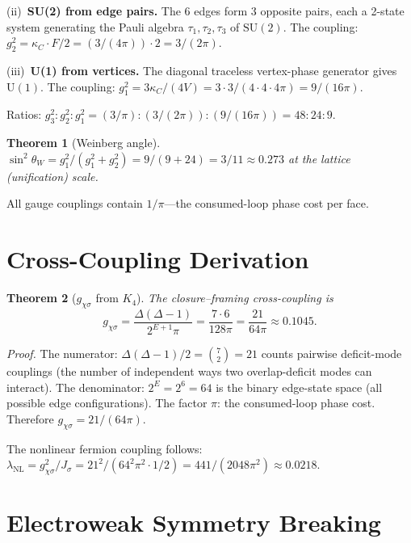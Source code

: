 \documentclass[11pt,twocolumn]{article}
\newtheorem{theorem}{Theorem}
\begin{document}
(ii)~\textbf{SU(2) from edge pairs.} The 6 edges form 3 opposite pairs, each a 2-state system generating the Pauli algebra $\tau_1,\tau_2,\tau_3$ of $\mathrm{SU}(2)$.
The coupling: $g_2^2=\kappa_C\cdot F/2=(3/(4\pi))\cdot 2=3/(2\pi)$.

(iii)~\textbf{U(1) from vertices.} The diagonal traceless vertex-phase generator gives $\mathrm{U}(1)$.
The coupling: $g_1^2=3\kappa_C/(4V)=3\cdot 3/(4\cdot 4\cdot 4\pi)=9/(16\pi)$.

Ratios: $g_3^2:g_2^2:g_1^2=(3/\pi):(3/(2\pi)):(9/(16\pi))=48:24:9$.

\begin{theorem}[Weinberg angle]
\label{thm:weinberg}
$\sin^2\theta_W=g_1^2/(g_1^2+g_2^2)=9/(9+24)=3/11\approx 0.273$ at the lattice (unification) scale.
\end{theorem}

All gauge couplings contain $1/\pi$---the consumed-loop phase cost per face.

\section{Cross-Coupling Derivation}
\label{sec:crosscoupling}

\begin{theorem}[$g_{\chi\sigma}$ from $K_4$]
\label{thm:gxs}
The closure--framing cross-coupling is
\begin{equation}
g_{\chi\sigma}=\frac{\Delta(\Delta{-}1)}{2^{E+1}\pi}=\frac{7\cdot 6}{128\pi}=\frac{21}{64\pi}\approx 0.1045.
\label{eq:gxs}
\end{equation}
\end{theorem}

\textit{Proof.}
The numerator: $\Delta(\Delta{-}1)/2=\binom{7}{2}=21$ counts pairwise deficit-mode couplings (the number of independent ways two overlap-deficit modes can interact).
The denominator: $2^E=2^6=64$ is the binary edge-state space (all possible edge configurations).
The factor $\pi$: the consumed-loop phase cost.
Therefore $g_{\chi\sigma}=21/(64\pi)$.

The nonlinear fermion coupling follows: $\lambda_{\mathrm{NL}}=g_{\chi\sigma}^2/J_\sigma=21^2/(64^2\pi^2\cdot 1/2)=441/(2048\pi^2)\approx 0.0218$.

\section{Electroweak Symmetry Breaking}
\label{sec:ewsb}
\end{document}

